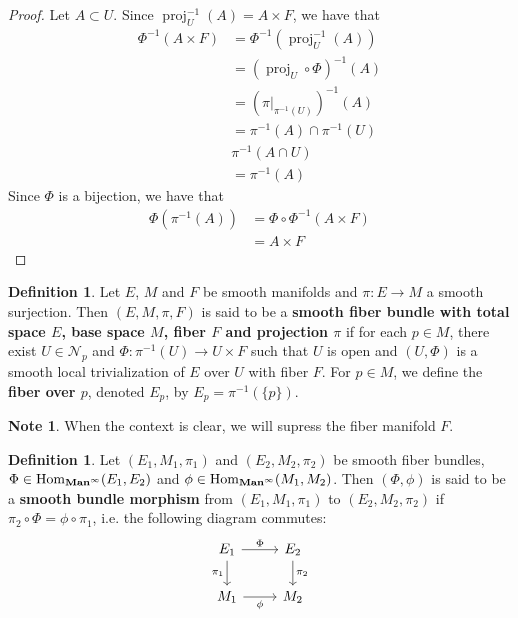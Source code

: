 \documentclass{book}
\theoremstyle{definition}
\newtheorem{defn}[definition]{Definition}
\newtheorem{note}[definition]{Note}
\newcommand{\MN}{\mathcal{N}}
\DeclareMathOperator{\Hom}{Hom}
\DeclareMathOperator{\prj}{\text{proj}}
\DeclareMathOperator*{\Maninf}{\text{\tbf{Man}}^{\infty}}
\DeclareMathOperator*{\0}{\mbf{0}}
\DeclareMathOperator*{\1}{\mbf{1}}
\newcommand{\tbf}[1]{\textbf{#1}}
\begin{document}
	\begin{proof}
		Let $A \subset U$. Since $\prj_U^{-1}(A) = A \times F$, we have that 
		\begin{align*}
			\Phi^{-1}(A \times F)
			& = \Phi^{-1}(\prj_U^{-1}(A)) \\
			& = (\prj_U \circ \Phi)^{-1}(A) \\
			& = (\pi|_{\pi^{-1}(U)})^{-1}(A) \\
			& = \pi^{-1}(A) \cap \pi^{-1}(U) \\
			&  \pi^{-1}(A \cap U) \\
			& = \pi^{-1}(A)
		\end{align*}
		Since $\Phi$ is a bijection, we have that
		\begin{align*}
			\Phi (\pi^{-1}(A))
			&= \Phi \circ \Phi^{-1}(A \times F) \\
			&= A \times F
		\end{align*}
	\end{proof}

	\begin{defn}
		Let $E$, $M$ and $F$ be smooth manifolds and $\pi: E \rightarrow M$ a smooth surjection. Then $(E, M, \pi, F)$ is said to be a \tbf{smooth fiber bundle with total space $E$, base space $M$, fiber $F$ and projection $\pi$} if for each $p \in M$, there exist $U \in \MN_p$ and $\Phi: \pi^{-1}(U) \rightarrow U \times F$ such that $U$ is open and $(U, \Phi)$ is a smooth local trivialization of $E$ over $U$ with fiber $F$. For $p \in M$, we define the \tbf{fiber over $p$}, denoted $E_p$, by $E_p = \pi^{-1}(\{p\})$.
	\end{defn}

	\begin{note}
		When the context is clear, we will supress the fiber manifold $F$.
	\end{note}

	\begin{defn}
		Let $(E_1, M_1, \pi_1)$ and $(E_2, M_2, \pi_2)$ be smooth fiber bundles, $\Phi \in \Hom_{\Maninf}(E_1, E_2)$ and $\phi \in \Hom_{\Maninf}(M_1, M_2)$. Then $(\Phi, \phi)$ is said to be a \tbf{smooth bundle morphism} from $(E_1, M_1, \pi_1)$ to $(E_2, M_2, \pi_2)$ if 
		$\pi_2 \circ \Phi = \phi \circ \pi_1$, 
		i.e. the following diagram commutes:
		\[ 
		\begin{tikzcd}
			E_1 \arrow[r, "\Phi"] \arrow[d, "\pi_1"'] & E_2  \arrow[d, "\pi_2"] \\
			M_1 \arrow[r, "\phi"']                  & M_2
		\end{tikzcd}
		\] 
	\end{defn}
	
\end{document}
